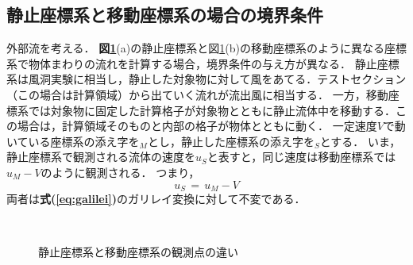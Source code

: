\subsection{静止座標系と移動座標系の場合の境界条件}
\label{sec:moving_grid}
外部流を考える．
\textbf{図\ref{fig:reference_frame}}(a)の静止座標系と{図\ref{fig:reference_frame}}(b)の移動座標系のように異なる座標系で物体まわりの流れを計算する場合，境界条件の与え方が異なる．
静止座標系は風洞実験に相当し，静止した対象物に対して風をあてる．テストセクション（この場合は計算領域）から出ていく流れが流出風に相当する．
一方，移動座標系では対象物に固定した計算格子が対象物とともに静止流体中を移動する．この場合は，計算領域そのものと内部の格子が物体とともに動く．
一定速度$V$で動いている座標系の添え字を${}_M$とし，静止した座標系の添え字を${}_S$とする．
いま，静止座標系で観測される流体の速度を$u_{S}$と表すと，同じ速度は移動座標系では$u_{M}-V$のように観測される．
つまり，
\begin{equation}
u_{S} \, = \, u_{M}-V
\label{eq:galilei}
\end{equation}
両者は\textbf{式(\ref{eq:galilei})}のガリレイ変換に対して不変である．

\begin{figure}[htbp]
\begin{center}
~
\caption{静止座標系と移動座標系の観測点の違い} 
\label{fig:reference_frame}
\end{center}
\end{figure}

